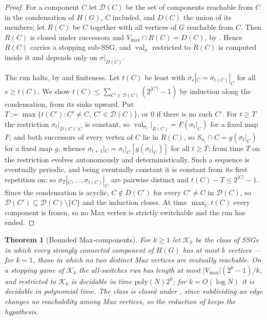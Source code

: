 \documentclass[11pt]{article}
\theoremstyle{plain}
\newtheorem{theorem}{Theorem}[section]
\theoremstyle{definition}
\DeclareMathOperator{\val}{val}
\newcommand{\Vmax}{V_{\max}}
\begin{document}
\begin{proof}
For a component $C$ let $\mathcal D(C)$ be the set of components
reachable from $C$ in the condensation of $H(G)$, $C$ included, and
$D(C)$ the union of its members; let $R(C)$ be $C$ together with all
vertices of $G$ reachable from $C$. Then $R(C)$ is
closed under successors and $\Vmax\cap R(C)=D(C)$, by
. Hence $R(C)$ carries a stopping sub-SSG, and
$\val_\sigma$ restricted to $R(C)$ is computed inside it and depends only
on $\sigma|_{D(C)}$.

The run halts, by  and finiteness. Let $t(C)$ be least
with $\sigma_s|_C=\sigma_{t(C)}|_C$ for all $s\ge t(C)$. We show
$t(C)\le\sum_{C'\in\mathcal D(C)}(2^{|C'|}-1)$ by induction along the
condensation, from its sinks upward. Put
$T:=\max\{t(C'):C'\ne C,\ C'\in\mathcal D(C)\}$, or $0$ if there is no such
$C'$. For $t\ge T$ the restriction $\sigma_t|_{D(C)\setminus C}$ is
constant, so $\val_{\sigma_t}|_{R(C)}=F(\sigma_t|_C)$ for a fixed map
$F$; and both successors of every vertex of $C$ lie in $R(C)$, so
$S_{\sigma_t}\cap C=g(\sigma_t|_C)$ for a fixed map $g$, whence
$\sigma_{t+1}|_C=\sigma_t|_C[g(\sigma_t|_C)]$ for all $t\ge T$: from time
$T$ on the restriction evolves autonomously and deterministically. Such a
sequence is eventually periodic, and being eventually constant it is
constant from its first repetition on; so
$\sigma_T|_C,\dots,\sigma_{t(C)}|_C$ are pairwise distinct and
$t(C)-T\le2^{|C|}-1$. Since the condensation is acyclic, $C\notin D(C')$
for every $C'\ne C$ in $\mathcal D(C)$, so $\mathcal D(C')\subseteq\mathcal D(C)\setminus\{C\}$ and
the induction closes. At time $\max_C t(C)$ every component is frozen, so
no Max vertex is strictly switchable and the run has ended.
\end{proof}

\begin{theorem}[Bounded Max-components]\label{thm:bounded-components}
For $k\ge1$ let $\mathcal K_k$ be the class of SSGs in which every
strongly connected component of $H(G)$ has at most $k$ vertices --- for
$k=1$, those in which no two distinct Max vertices are mutually reachable.
On a stopping game of $\mathcal K_k$ the all-switches run has length at
most $|\Vmax|(2^{k}-1)/k$, and  restricted to
$\mathcal K_k$ is decidable in time $\mathrm{poly}(N)2^{k}$; for
$k=O(\log N)$ it is decidable in polynomial time. The class is closed
under , since subdividing an edge changes no
reachability among Max vertices, so the reduction of
 keeps the hypothesis.
\end{theorem}
\end{document}
